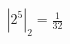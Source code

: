 \documentclass[preview]{standalone}
\begin{document}
\begin{align*}
\left| 2^{5} \right|_2 = \frac{1}{32}
\end{align*}
\end{document}

